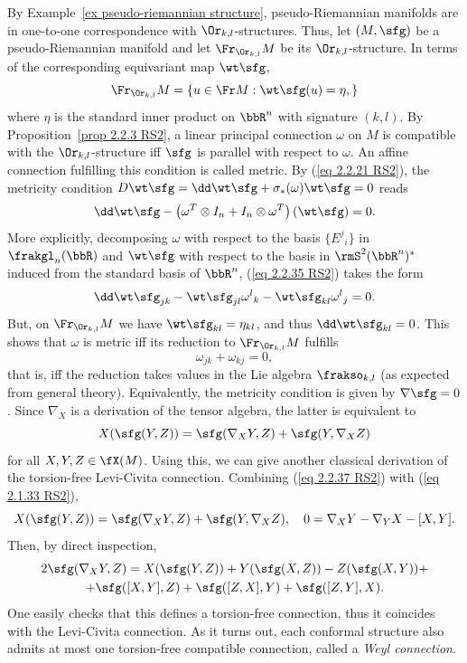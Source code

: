 \begin{example}
    By Example~\ref{ex pseudo-riemannian structure}, pseudo-Riemannian manifolds are in one-to-one correspondence with $\Or_{k,l}$-structures. Thus, let $(M,\sfg)$ be a pseudo-Riemannian manifold and let $\Fr_{\Or_{k,l}} M$ be its $\Or_{k,l}$-structure. In terms of the corresponding equivariant map $\wt\sfg$, 
    \[\Fr_{\Or_{k,l}}M=\{u \in\Fr M:\wt\sfg(u)=\eta,\}\]
    where $\eta$ is the standard inner product on $\bbR^n$ with signature $(k,l)$. By Proposition~\ref{prop 2.2.3 RS2}, a linear principal connection $\omega$ on $M$ is compatible with the $\Or_{k,l}$-structure iff $\sfg$ is parallel with respect to $\omega$. An affine connection fulfilling this condition is called metric. By (\ref{eq 2.2.21 RS2}), the metricity condition $D\wt\sfg=\dd\wt\sfg+\sigma_\ast(\omega)\wt\sfg=0$ reads 
    \[\dd\wt\sfg-\left(\omega^T\otimes I_n+I_n\otimes \omega^T\right)(\wt\sfg)=0.\label{eq 2.2.35 RS2}\]
    More explicitly, decomposing $\omega$ with respect to the basis $\{E^j{}_i\}$ in $\frakgl_n(\bbR)$ and $\wt\sfg$ with respect to the basis in $\rmS^2(\bbR^n)^\ast$ induced from the standard basis of $\bbR^n$, (\ref{eq 2.2.35 RS2}) takes the form 
    \[\dd \wt\sfg_{jk}-\wt\sfg_{jl}\omega^l{}_k-\wt\sfg_{kl}\omega^l{}_j=0.\]
    But, on $\Fr_{\Or_{k,l}} M$ we have $\wt\sfg_{kl}=\eta_{kl}$, and thus $\dd\wt\sfg_{kl}=0$. This shows that $\omega$ is metric iff its reduction to $\Fr_{\Or_{k,l}}M$ fulfills 
    \[\omega_{jk}+\omega_{kj}=0,\]
    that is, iff the reduction takes values in the Lie algebra $\frakso_{k,l}$ (as expected from general theory). Equivalently, the metricity condition is given by $\nabla\sfg=0$. Since $\nabla_X$ is a derivation of the tensor algebra, the latter is equivalent to 
    \[X(\sfg(Y,Z))=\sfg(\nabla_X Y,Z)+\sfg(Y,\nabla_X Z)\label{eq 2.2.37 RS2}\]
    for all $X,Y,Z\in\fX(M)$. Using this, we can give another classical derivation of the torsion-free Levi-Civita connection. Combining (\ref{eq 2.2.37 RS2}) with (\ref{eq 2.1.33 RS2}), 
    \[X(\sfg(Y,Z))=\sfg(\nabla_X Y,Z)+\sfg(Y,\nabla_X Z),\quad 0=\nabla_X Y-\nabla_Y X-[X,Y].\]
    Then, by direct inspection,
    \begin{multline}
        2\sfg(\nabla_X Y,Z)=X(\sfg(Y,Z))+Y(\sfg(X,Z))-Z(\sfg(X,Y))+\\
        +\sfg([X,Y],Z)+\sfg([Z,X],Y)+\sfg([Z,Y],X).\label{eq 2.2.40 RS2}
    \end{multline}
    One easily checks that this defines a torsion-free connection, thus it coincides with the Levi-Civita connection.  As it turns out, each conformal structure also admits at most one torsion-free compatible connection, called a \emph{Weyl connection}.
\end{example}


